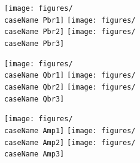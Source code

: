 \documentclass[12pt]{article}
\begin{document}
\newcommand{\caseName}{SixMachineRamp1}
\begin{landscape}

\texttt{[image: figures/\\caseName Pbr1]}%
\texttt{[image: figures/\\caseName Pbr2]}%
\texttt{[image: figures/\\caseName Pbr3]}

\texttt{[image: figures/\\caseName Qbr1]}%
\texttt{[image: figures/\\caseName Qbr2]}%
\texttt{[image: figures/\\caseName Qbr3]}

\texttt{[image: figures/\\caseName Amp1]}%
\texttt{[image: figures/\\caseName Amp2]}%
\texttt{[image: figures/\\caseName Amp3]}

\end{landscape}


		
\end{document}
